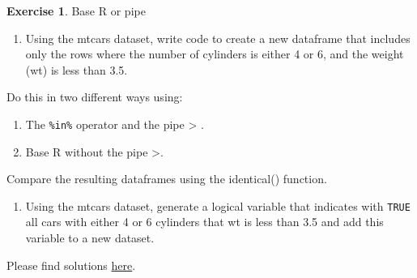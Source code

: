 \documentclass[
  12pt,
  oneside]{book}
\providecommand{\tightlist}{%
  \setlength{\itemsep}{0pt}\setlength{\parskip}{0pt}}
\theoremstyle{definition}
\theoremstyle{definition}
\theoremstyle{definition}
\newtheorem{exercise}{Exercise}[chapter]
\theoremstyle{definition}
\theoremstyle{remark}
\begin{document}
\begin{exercise}
\protect\hypertarget{exr:baseorpipe}{}\label{exr:baseorpipe}Base R or pipe

\begin{enumerate}
\def\labelenumi{\alph{enumi})}
\tightlist
\item
  Using the mtcars dataset, write code to create a new dataframe that includes only the rows where the number of cylinders is either 4 or 6, and the weight (wt) is less than 3.5.
\end{enumerate}

Do this in two different ways using:

\begin{enumerate}
\def\labelenumi{\arabic{enumi}.}
\tightlist
\item
  The \texttt{\%in\%} operator and the pipe \textbar\textgreater{} .
\item
  Base R without the pipe \textbar\textgreater.
\end{enumerate}

Compare the resulting dataframes using the identical() function.

\begin{enumerate}
\def\labelenumi{\alph{enumi})}
\setcounter{enumi}{1}
\tightlist
\item
  Using the mtcars dataset, generate a logical variable that indicates with \texttt{TRUE} all cars with either 4 or 6 cylinders that wt is less than 3.5 and add this variable to a new dataset.
\end{enumerate}

Please find solutions \href{https://raw.githubusercontent.com/hubchev/courses/main/scr/exe_base_pipe.R}{here}.
\end{exercise}
\end{document}
